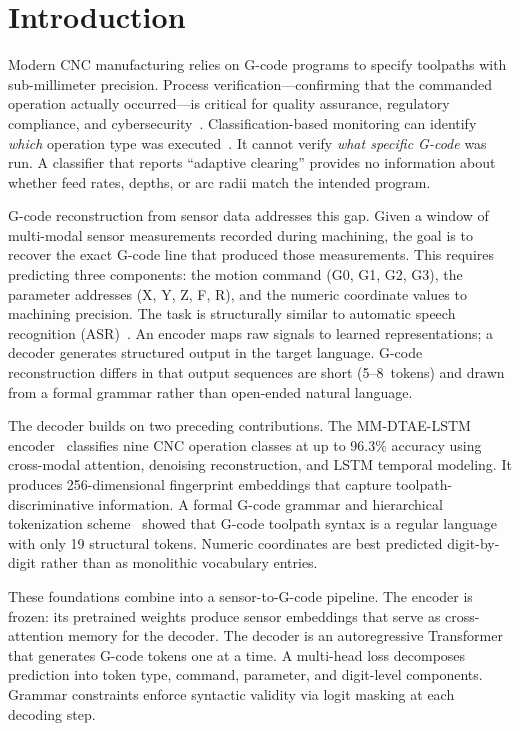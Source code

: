 \documentclass[sensors,article,submit,moreauthors,pdftex]{Definitions/mdpi}
\newcommand{\modelname}{MM-DTAE-LSTM}
\begin{document}
\section{Introduction}
\label{sec:introduction}

Modern CNC manufacturing relies on G-code programs to specify toolpaths with sub-millimeter precision. Process verification---confirming that the commanded operation actually occurred---is critical for quality assurance, regulatory compliance, and cybersecurity~\cite{encoder_paper}. Classification-based monitoring can identify \emph{which} operation type was executed~\cite{teti2010advanced,serin2020tool}. It cannot verify \emph{what specific G-code} was run. A classifier that reports ``adaptive clearing'' provides no information about whether feed rates, depths, or arc radii match the intended program.

G-code reconstruction from sensor data addresses this gap. Given a window of multi-modal sensor measurements recorded during machining, the goal is to recover the exact G-code line that produced those measurements. This requires predicting three components: the motion command (G0, G1, G2, G3), the parameter addresses (X, Y, Z, F, R), and the numeric coordinate values to machining precision. The task is structurally similar to automatic speech recognition (ASR)~\cite{graves2013speech}. An encoder maps raw signals to learned representations; a decoder generates structured output in the target language. G-code reconstruction differs in that output sequences are short (5--8~tokens) and drawn from a formal grammar rather than open-ended natural language.

The decoder builds on two preceding contributions. The \modelname{} encoder~\cite{encoder_paper} classifies nine CNC operation classes at up to 96.3\% accuracy using cross-modal attention, denoising reconstruction, and LSTM temporal modeling. It produces 256-dimensional fingerprint embeddings that capture toolpath-discriminative information. A formal G-code grammar and hierarchical tokenization scheme~\cite{grammar_paper} showed that G-code toolpath syntax is a regular language with only 19 structural tokens. Numeric coordinates are best predicted digit-by-digit rather than as monolithic vocabulary entries.

These foundations combine into a sensor-to-G-code pipeline. The encoder is frozen: its pretrained weights produce sensor embeddings that serve as cross-attention memory for the decoder. The decoder is an autoregressive Transformer that generates G-code tokens one at a time. A multi-head loss decomposes prediction into token type, command, parameter, and digit-level components. Grammar constraints enforce syntactic validity via logit masking at each decoding step.
\end{document}
